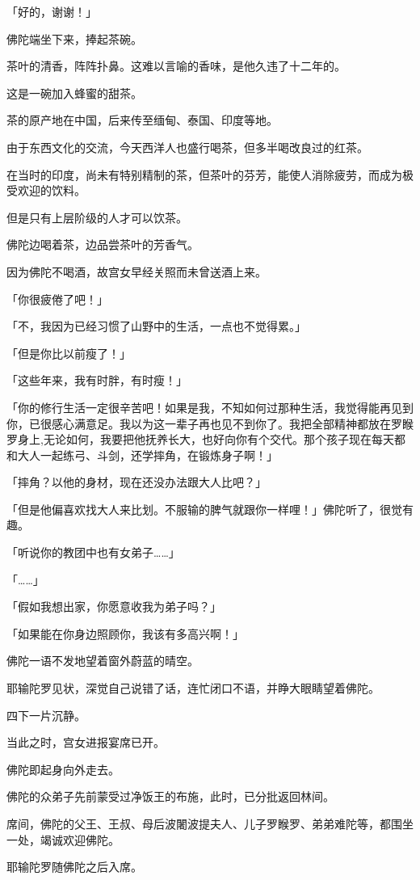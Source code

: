 \documentclass[twoside,openany]{book}
\begin{document}
「好的，谢谢！」

佛陀端坐下来，捧起茶碗。

茶叶的清香，阵阵扑鼻。这难以言喻的香味，是他久违了十二年的。

这是一碗加入蜂蜜的甜茶。

茶的原产地在中国，后来传至缅甸、泰国、印度等地。

由于东西文化的交流，今天西洋人也盛行喝茶，但多半喝改良过的红茶。

在当时的印度，尚未有特别精制的茶，但茶叶的芬芳，能使人消除疲劳，而成为极受欢迎的饮料。

但是只有上层阶级的人才可以饮茶。

佛陀边喝着茶，边品尝茶叶的芳香气。

因为佛陀不喝酒，故宫女早经关照而未曾送酒上来。

「你很疲倦了吧！」

「不，我因为已经习惯了山野中的生活，一点也不觉得累。」

「但是你比以前瘦了！」

「这些年来，我有时胖，有时瘦！」

「你的修行生活一定很辛苦吧！如果是我，不知如何过那种生活，我觉得能再见到你，已很感心满意足。我以为这一辈子再也见不到你了。我把全部精神都放在罗睺罗身上,无论如何，我要把他抚养长大，也好向你有个交代。那个孩子现在每天都和大人一起练弓、斗剑，还学摔角，在锻炼身子啊！」

「摔角？以他的身材，现在还没办法跟大人比吧？」

「但是他偏喜欢找大人来比划。不服输的脾气就跟你一样哩！」佛陀听了，很觉有趣。

「听说你的教团中也有女弟子……」

「……」

「假如我想出家，你愿意收我为弟子吗？」

「如果能在你身边照顾你，我该有多高兴啊！」

佛陀一语不发地望着窗外蔚蓝的晴空。

耶输陀罗见状，深觉自己说错了话，连忙闭口不语，并睁大眼睛望着佛陀。

四下一片沉静。

当此之时，宫女进报宴席已开。

佛陀即起身向外走去。

佛陀的众弟子先前蒙受过净饭王的布施，此时，已分批返回林间。

席间，佛陀的父王、王叔、母后波闍波提夫人、儿子罗睺罗、弟弟难陀等，都围坐一处，竭诚欢迎佛陀。

耶输陀罗随佛陀之后入席。
\end{document}

